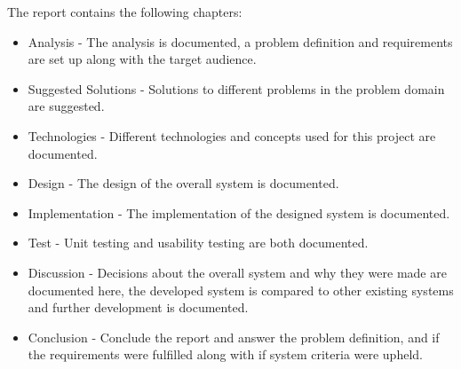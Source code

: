 The report contains the following chapters:
\begin{itemize}
\item Analysis - The analysis is documented, a problem definition and requirements are set up along with the target audience.
\item Suggested Solutions - Solutions to different problems in the problem domain are suggested.
\item Technologies - Different technologies and concepts used for this project are documented.
\item Design - The design of the overall system is documented.
\item Implementation - The implementation of the designed system is documented.
\item Test - Unit testing and usability testing are both documented. 
\item Discussion - Decisions about the overall system and why they were made are documented here, the developed system is compared to other existing systems and further development is documented.
\item Conclusion - Conclude the report and answer the problem definition, and if the requirements were fulfilled along with if system criteria were upheld.
\end{itemize}